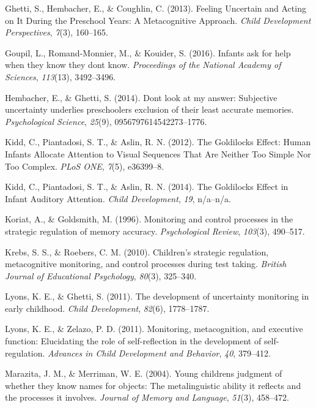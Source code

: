 \documentclass[english,man]{apa6}
\theoremstyle{definition}
\theoremstyle{definition}
\theoremstyle{definition}
\theoremstyle{remark}
\begin{document}
\hypertarget{ref-Ghetti2013}{}
Ghetti, S., Hembacher, E., \& Coughlin, C. (2013). Feeling Uncertain and
Acting on It During the Preschool Years: A Metacognitive Approach.
\emph{Child Development Perspectives}, \emph{7}(3), 160--165.

\hypertarget{ref-Goupil2016}{}
Goupil, L., Romand-Monnier, M., \& Kouider, S. (2016). Infants ask for
help when they know they dont know. \emph{Proceedings of the National
Academy of Sciences}, \emph{113}(13), 3492--3496.

\hypertarget{ref-Hembacher2014}{}
Hembacher, E., \& Ghetti, S. (2014). Dont look at my answer: Subjective
uncertainty underlies preschoolers exclusion of their least accurate
memories. \emph{Psychological Science}, \emph{25}(9),
0956797614542273--1776.

\hypertarget{ref-Kidd2012}{}
Kidd, C., Piantadosi, S. T., \& Aslin, R. N. (2012). The Goldilocks
Effect: Human Infants Allocate Attention to Visual Sequences That Are
Neither Too Simple Nor Too Complex. \emph{PLoS ONE}, \emph{7}(5),
e36399--8.

\hypertarget{ref-Kidd2014}{}
Kidd, C., Piantadosi, S. T., \& Aslin, R. N. (2014). The Goldilocks
Effect in Infant Auditory Attention. \emph{Child Development},
\emph{19}, n/a--n/a.

\hypertarget{ref-Koriat1996}{}
Koriat, A., \& Goldsmith, M. (1996). Monitoring and control processes in
the strategic regulation of memory accuracy. \emph{Psychological
Review}, \emph{103}(3), 490--517.

\hypertarget{ref-Krebs2010}{}
Krebs, S. S., \& Roebers, C. M. (2010). Children's strategic regulation,
metacognitive monitoring, and control processes during test taking.
\emph{British Journal of Educational Psychology}, \emph{80}(3),
325--340.

\hypertarget{ref-Lyons2011a}{}
Lyons, K. E., \& Ghetti, S. (2011). The development of uncertainty
monitoring in early childhood. \emph{Child Development}, \emph{82}(6),
1778--1787.

\hypertarget{ref-Lyons2011}{}
Lyons, K. E., \& Zelazo, P. D. (2011). Monitoring, metacognition, and
executive function: Elucidating the role of self-reflection in the
development of self-regulation. \emph{Advances in Child Development and
Behavior}, \emph{40}, 379--412.

\hypertarget{ref-Marazita2004}{}
Marazita, J. M., \& Merriman, W. E. (2004). Young childrens judgment of
whether they know names for objects: The metalinguistic ability it
reflects and the processes it involves. \emph{Journal of Memory and
Language}, \emph{51}(3), 458--472.
\end{document}

